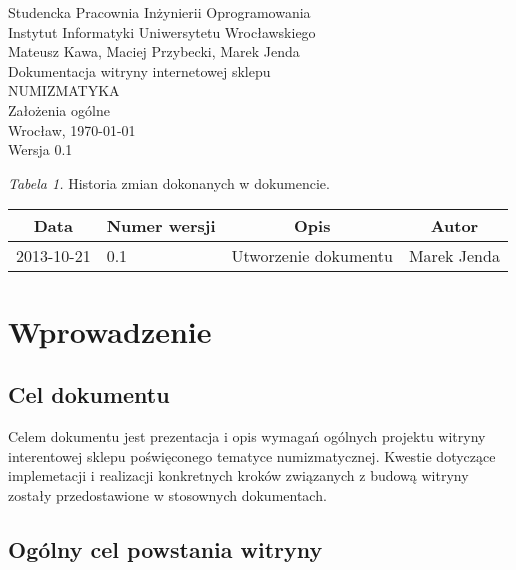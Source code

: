 \documentclass[11pt,a4paper,leqno]{article}			%
\begin{document}
\begin{center}
\thispagestyle{empty} 					%
{\Large Studencka Pracownia Inżynierii Oprogramowania}\\[0.5cm]
{\large Instytut Informatyki Uniwersytetu Wrocławskiego}\\[6.0cm]


{\large Mateusz Kawa, Maciej Przybecki, Marek Jenda}\\[1.5cm]
{\huge Dokumentacja witryny internetowej sklepu }\\[0.5cm]
{\huge NUMIZMATYKA }\\[1.5cm]
{\large Założenia ogólne}\\[0.5cm]
\vfill
{\large Wrocław, \today}\\[0.5cm]
{\large Wersja 0.1}
\end{center}

\newpage

\textit{Tabela 1.} Historia zmian dokonanych w dokumencie.
\begin{center}
\begin{tabular}{| l | l | l | l |}
\hline
	\multicolumn{1}{|c|}{Data} & \multicolumn{1}{|c|}{Numer wersji} &  \multicolumn{1}{|c|}{Opis} & \multicolumn{1}{|c|}{Autor} \\ \hline \hline
	2013-10-21 & 0.1 & Utworzenie dokumentu & Marek Jenda \\ \hline
\end{tabular}
\end{center}
\newpage

\tableofcontents
\newpage


\newpage
\section{Wprowadzenie}

\subsection{Cel dokumentu}
\noindent
Celem  dokumentu jest prezentacja i opis wymagań ogólnych projektu witryny interentowej sklepu poświęconego tematyce numizmatycznej.
Kwestie dotyczące implemetacji i realizacji konkretnych kroków związanych z budową witryny zostały przedostawione w stosownych dokumentach.

\subsection{Ogólny cel powstania witryny}
\end{document}
